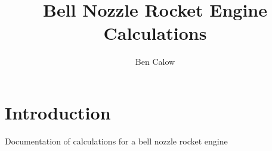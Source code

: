 \documentclass{article}
\title{Bell Nozzle Rocket Engine Calculations}
\author{Ben Calow}
\begin{document}
\clearpage\maketitle
\thispagestyle{empty}

\pagebreak

\setcounter{page}{1}

\tableofcontents

\pagebreak

\noindent
\begin{minipage}{\linewidth}
    \begin{multicols}{2}
        
    \end{multicols}
\end{minipage}

\pagebreak

\section{Introduction}

Documentation of calculations for a bell nozzle rocket engine
\end{document}
